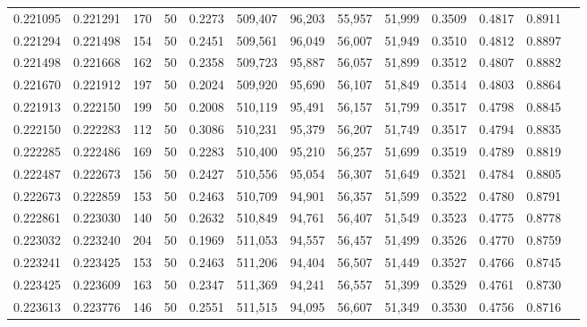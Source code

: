\begin{tabular}{rrrrrrrrrrrrr}
0.221095 & 0.221291 &   170 &  50 &                                     0.2273 & 509,407 &  96,203 &  55,957 &  51,999 & 0.3509 & 0.4817 & 0.8911 \\
0.221294 & 0.221498 &   154 &  50 &                                     0.2451 & 509,561 &  96,049 &  56,007 &  51,949 & 0.3510 & 0.4812 & 0.8897 \\
0.221498 & 0.221668 &   162 &  50 &                                     0.2358 & 509,723 &  95,887 &  56,057 &  51,899 & 0.3512 & 0.4807 & 0.8882 \\
0.221670 & 0.221912 &   197 &  50 &                                     0.2024 & 509,920 &  95,690 &  56,107 &  51,849 & 0.3514 & 0.4803 & 0.8864 \\
0.221913 & 0.222150 &   199 &  50 &                                     0.2008 & 510,119 &  95,491 &  56,157 &  51,799 & 0.3517 & 0.4798 & 0.8845 \\
0.222150 & 0.222283 &   112 &  50 &                                     0.3086 & 510,231 &  95,379 &  56,207 &  51,749 & 0.3517 & 0.4794 & 0.8835 \\
0.222285 & 0.222486 &   169 &  50 &                                     0.2283 & 510,400 &  95,210 &  56,257 &  51,699 & 0.3519 & 0.4789 & 0.8819 \\
0.222487 & 0.222673 &   156 &  50 &                                     0.2427 & 510,556 &  95,054 &  56,307 &  51,649 & 0.3521 & 0.4784 & 0.8805 \\
0.222673 & 0.222859 &   153 &  50 &                                     0.2463 & 510,709 &  94,901 &  56,357 &  51,599 & 0.3522 & 0.4780 & 0.8791 \\
0.222861 & 0.223030 &   140 &  50 &                                     0.2632 & 510,849 &  94,761 &  56,407 &  51,549 & 0.3523 & 0.4775 & 0.8778 \\
0.223032 & 0.223240 &   204 &  50 &                                     0.1969 & 511,053 &  94,557 &  56,457 &  51,499 & 0.3526 & 0.4770 & 0.8759 \\
0.223241 & 0.223425 &   153 &  50 &                                     0.2463 & 511,206 &  94,404 &  56,507 &  51,449 & 0.3527 & 0.4766 & 0.8745 \\
0.223425 & 0.223609 &   163 &  50 &                                     0.2347 & 511,369 &  94,241 &  56,557 &  51,399 & 0.3529 & 0.4761 & 0.8730 \\
0.223613 & 0.223776 &   146 &  50 &                                     0.2551 & 511,515 &  94,095 &  56,607 &  51,349 & 0.3530 & 0.4756 & 0.8716 \\

\end{tabular}
